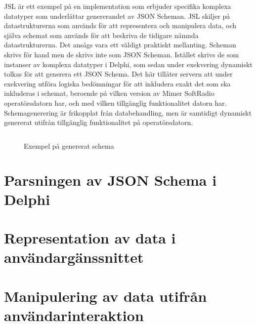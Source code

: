 JSL är ett exempel på en implementation som erbjuder specifika komplexa datatyper som underlättar genererandet av JSON Scheman. JSL skiljer på datastrukturerna som används för att representera och manipulera data, och själva schemat som används för att beskriva de tidigare nämnda datastrukturerna. \cite{Romanovich} Det ansågs vara ett väldigt praktiskt mellanting. Scheman skrivs för hand men de skrivs inte som JSON Scheman. Istället skrivs de som instanser av komplexa datatyper i Delphi, som sedan under exekvering dynamiskt tolkas för att generera ett JSON Schema. Det här tillåter servern att under exekvering utföra logiska bedömningar för att inkludera exakt det som ska inkluderas i schemat, beroende på vilken version av Mimer SoftRadio operatörsdatorn har, och med vilken tillgänglig funktionalitet datorn har. Schemagenerering är frikopplat från databehandling, men är samtidigt dynamiskt genererat utifrån tillgänglig funktionalitet på operatörsdatorn.

\begin{figure}
	\inputminted[tabsize=2, frame=single, fontsize=\tiny, framesep=2mm, breaklines]{json}{code/schema.json}
	\vspace{-1.7em}
	\caption{Exempel på genererat schema}
	\label{fig:real-schema}
\end{figure}

\section{Parsningen av JSON Schema i Delphi}


\section{Representation av data i användargänssnittet}


\section{Manipulering av data utifrån användarinteraktion}
